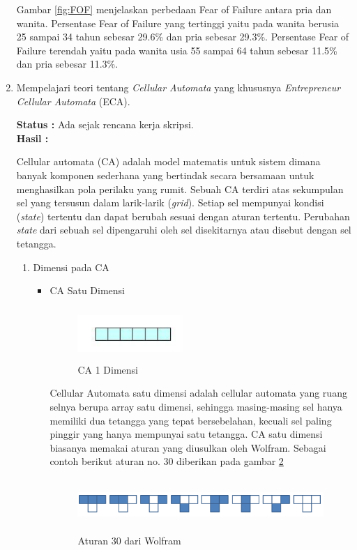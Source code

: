 \documentclass[a4paper,twoside]{article}
\begin{document}
\begin{enumerate}
Gambar \ref{fig:FOF} menjelaskan perbedaan Fear of Failure antara pria dan wanita. Persentase Fear of Failure yang tertinggi yaitu pada wanita berusia 25 sampai 34 tahun sebesar 29.6\% dan pria sebesar 29.3\%. Persentase Fear of Failure terendah yaitu pada wanita usia 55 sampai 64 tahun sebesar 11.5\% dan pria sebesar 11.3\%. 

	\item Mempelajari teori tentang \textit{Cellular Automata} yang khususnya \textit{Entrepreneur Cellular Automata} (ECA).
	
	
	  {\bf Status :} Ada sejak rencana kerja skripsi.\\
		{\bf Hasil :}
		
		Cellular automata (CA) adalah model matematis untuk sistem dimana banyak komponen sederhana yang bertindak secara bersamaan untuk menghasilkan pola perilaku yang rumit. Sebuah CA terdiri atas sekumpulan sel yang tersusun dalam larik-larik (\textit{grid}). Setiap sel mempunyai kondisi (\textit{state}) tertentu dan dapat berubah sesuai dengan aturan tertentu. Perubahan \textit{state} dari sebuah sel dipengaruhi oleh sel disekitarnya atau disebut dengan sel tetangga.
		\begin{enumerate}
			\item Dimensi pada CA
			 \begin{itemize}
			  \item CA Satu Dimensi
			
				\begin{figure} [H]
					\centering  
					\includegraphics[width=4cm, height=2cm]{CA1D} 
					\caption[CA 1 Dimensi]{CA 1 Dimensi} 
					\label{fig:CA1D} 
				\end{figure}
			
			Cellular Automata satu dimensi adalah cellular automata yang ruang selnya berupa array satu dimensi, sehingga masing-masing sel hanya memiliki dua tetangga yang tepat bersebelahan, kecuali sel paling pinggir yang hanya mempunyai satu tetangga. CA satu dimensi biasanya memakai aturan yang diusulkan oleh Wolfram. Sebagai contoh berikut aturan no. 30 diberikan pada gambar \ref{fig:wolfram}
			
			
			\begin{figure} [H]
					\centering  
					\includegraphics[width=10cm, height=2cm]{wolfram} 
					\caption[Aturan 30 dari Wolfram]{Aturan 30 dari Wolfram} 
					\label{fig:wolfram} 
				\end{figure}
				

\end{itemize}
\end{enumerate}
\end{enumerate}
\end{document}
